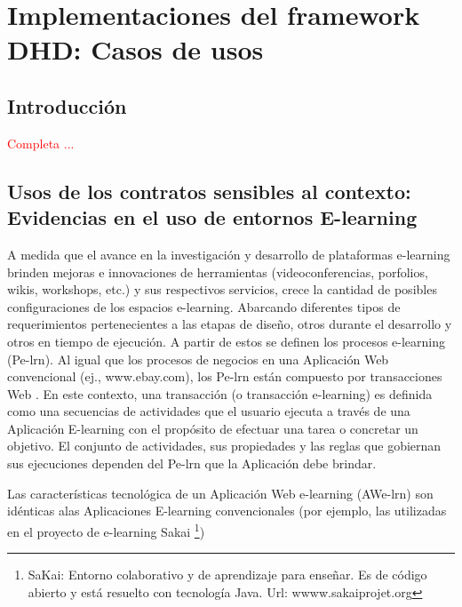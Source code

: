 
\chapter{Implementaciones del framework DHD: Casos de
usos}\label{cap:implementaciones} \label{cap:7}

\section{Introducción}

\textcolor{red}{Completa ...}

\section{Usos de los contratos sensibles al contexto: Evidencias en el uso de entornos E-learning}

A medida que el avance en la investigación y desarrollo de plataformas
e-learning brinden  mejoras e innovaciones de herramientas (videoconferencias,
porfolios, wikis, workshops, etc.) y sus respectivos servicios,  crece la
cantidad de posibles configuraciones de los espacios e-learning.  Abarcando
diferentes tipos de requerimientos pertenecientes a las etapas de diseño, otros
durante el desarrollo y otros en tiempo de ejecución. A partir de estos se
definen los procesos e-learning (Pe-lrn). Al igual que los procesos de negocios
en una Aplicación Web convencional (ej., www.ebay.com), los Pe-lrn están
compuesto por transacciones Web \cite{transaccion web}. En este contexto, una
transacción (o transacción e-learning) es definida como una secuencias de
actividades que el usuario ejecuta a través de una Aplicación E-learning con el
propósito de efectuar una tarea o concretar un objetivo. El conjunto de
actividades, sus propiedades y las reglas que gobiernan sus ejecuciones
dependen del Pe-lrn que la Aplicación debe brindar.

Las características tecnológica de un Aplicación Web e-learning (AWe-lrn) son
idénticas alas Aplicaciones E-learning convencionales (por ejemplo, las
utilizadas en el proyecto de e-learning Sakai \footnote{SaKai: Entorno
colaborativo y de aprendizaje para enseñar. Es de código abierto y está resuelto
con tecnología Java. Url: wwww.sakaiprojet.org}) 


